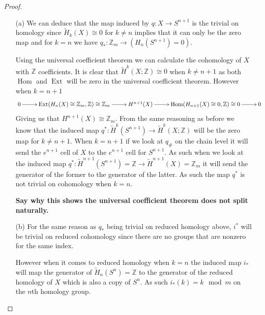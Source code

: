 \documentclass[10pt]{article}
\newcommand{\bb}[1]{\mathbb{#1}}
\newcommand{\rH}{\widetilde{H}}
\DeclareMathOperator{\Ext}{Ext}
\DeclareMathOperator{\Hom}{Hom}
\theoremstyle{remark}
\begin{document}
\begin{proof}
  \begin{itemize}
  \item[(a)]  We can deduce that the map induced by $q:X\rightarrow S^{n+1}$ is the trivial on homology
    since $\rH_k(X)\cong 0$ for $k\neq n$ implies that it can only be the zero map and for
    $k=n$ we have $q_*:\bb{Z}_m\rightarrow (H_n(S^{n+1})=0)$.

    Using the universal coefficient theorem we can calculate the cohomology of
    $X$ with $\bb{Z}$ coefficients. It is clear that $\rH^k(X;\bb{Z})\cong 0$ when
    $k\neq n+1$ as both $\Hom$ and $\Ext$ will be zero in the universal coefficient
    theorem. However when $k=n+1$
    \[
      \xymatrix{
        0 \ar[r] & \Ext(H_{n}(X)\cong \bb{Z}_m,\bb{Z})\cong \bb{Z}_m \ar[r] & H^{n+1}(X) \ar[r] & \Hom(H_{n+1}(X)\cong 0,\bb{Z})\cong 0 \ar[r] & 0\\
      }
    \]
    Giving us that $H^{n+1}(X)\cong \bb{Z}_m$. From the same reasoning as before we know
    that the induced map $q^*:\rH^k(S^{n+1})\rightarrow\rH^k(X;\bb{Z})$ will be the zero map
    for $k\neq n+1$. When $k=n+1$ if we look at $q_{\#}$ on the chain level it
    will send the $e^{n+1}$ cell of $X$ to the $e^{n+1}$ cell for $S^{n+1}$. As
    such when we look at the induced map $q^*:\rH^{n+1}(S^{n+1})=\bb{Z}\rightarrow \rH^{n+1}(X)=\bb{Z}_m$
    it will send the generator of the former to the generator of the latter. As
    such the map $q^*$ is not trivial on cohomology when $k=n$.

    \textbf{Say why this shows the universal coefficient theorem does not split
    naturally.}
\item[(b)] For the same reason as $q_*$ being trivial on reduced homology above, $i^*$
  will be trivial on reduced cohomology since there are no groups that are nonzero
  for the same index.

  However when it comes to reduced homology when $k=n$ the induced map $i_*$
  will map the generator of $\rH_n(S^n)=\bb{Z}$ to the generator of the reduced
  homology of $X$ which is also a copy of $S^n$. As such $i_*(k)=k\mod m$
  on the $n$th homology group.
  \end{itemize}
\end{proof}
\end{document}
